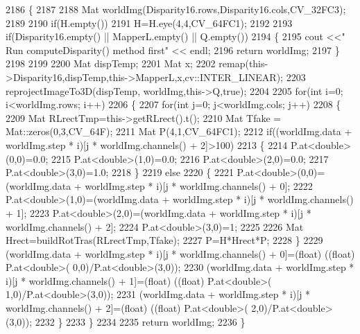 \begin{DoxyCode}
2186 \{
2187 
2188     Mat worldImg(Disparity16.rows,Disparity16.cols,CV\_32FC3);
2189 
2190     \textcolor{keywordflow}{if}(H.empty())
2191         H=H.eye(4,4,CV\_64FC1);
2192 
2193     \textcolor{keywordflow}{if}(Disparity16.empty() || MapperL.empty() || Q.empty())
2194     \{
2195         cout <<\textcolor{stringliteral}{" Run computeDisparity() method first"} << endl;
2196         \textcolor{keywordflow}{return} worldImg;
2197     \}
2198 
2199 
2200     Mat dispTemp;
2201     Mat x;
2202     remap(this->Disparity16,dispTemp,this->MapperL,x,cv::INTER\_LINEAR);
2203     reprojectImageTo3D(dispTemp, worldImg,this->Q,\textcolor{keyword}{true});
2204 
2205     \textcolor{keywordflow}{for}(\textcolor{keywordtype}{int} i=0; i<worldImg.rows; i++)
2206     \{
2207        \textcolor{keywordflow}{for}(\textcolor{keywordtype}{int} j=0; j<worldImg.cols; j++)
2208         \{   
2209             Mat RLrectTmp=this->getRLrect().t();
2210             Mat Tfake = Mat::zeros(0,3,CV\_64F);
2211             Mat P(4,1,CV\_64FC1);
2212             \textcolor{keywordflow}{if}((worldImg.data + worldImg.step * i)[j * worldImg.channels() + 2]>100)
2213             \{
2214                 P.at<\textcolor{keywordtype}{double}>(0,0)=0.0;
2215                 P.at<\textcolor{keywordtype}{double}>(1,0)=0.0;
2216                 P.at<\textcolor{keywordtype}{double}>(2,0)=0.0;
2217                 P.at<\textcolor{keywordtype}{double}>(3,0)=1.0;
2218             \}
2219             \textcolor{keywordflow}{else}
2220             \{
2221                 P.at<\textcolor{keywordtype}{double}>(0,0)=(worldImg.data + worldImg.step * i)[j * worldImg.channels() + 0];
2222                 P.at<\textcolor{keywordtype}{double}>(1,0)=(worldImg.data + worldImg.step * i)[j * worldImg.channels() + 1];
2223                 P.at<\textcolor{keywordtype}{double}>(2,0)=(worldImg.data + worldImg.step * i)[j * worldImg.channels() + 2];
2224                 P.at<\textcolor{keywordtype}{double}>(3,0)=1;
2225 
2226                 Mat Hrect=buildRotTras(RLrectTmp,Tfake);
2227                 P=H*Hrect*P;
2228             \}
2229             (worldImg.data + worldImg.step * i)[j * worldImg.channels() + 0]=(float) ((\textcolor{keywordtype}{float}) P.at<\textcolor{keywordtype}{double}>(
      0,0)/P.at<\textcolor{keywordtype}{double}>(3,0));
2230             (worldImg.data + worldImg.step * i)[j * worldImg.channels() + 1]=(float) ((\textcolor{keywordtype}{float}) P.at<\textcolor{keywordtype}{double}>(
      1,0)/P.at<\textcolor{keywordtype}{double}>(3,0));
2231             (worldImg.data + worldImg.step * i)[j * worldImg.channels() + 2]=(float) ((\textcolor{keywordtype}{float}) P.at<\textcolor{keywordtype}{double}>(
      2,0)/P.at<\textcolor{keywordtype}{double}>(3,0));
2232         \}
2233     \}
2234     
2235     \textcolor{keywordflow}{return} worldImg;
2236 \}
\end{DoxyCode}
